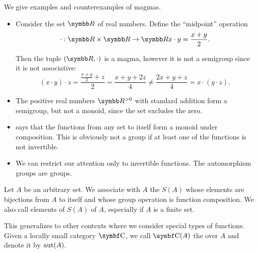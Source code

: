 \begin{example}\label{ex:magmas}
  We give examples and counterexamples of magmas.

  \begin{itemize}
    \item Consider the set \( \R \) of real numbers. Define the \enquote{midpoint} operation
    \begin{equation*}
      \cdot: \R \times \R \to \R \\
      x \cdot y = \frac {x + y} 2.
    \end{equation*}

    Then the tuple \( (\R, \cdot) \) is a magma, however it is not a semigroup since it is not associative:
    \begin{equation*}
      (x \cdot y) \cdot z = \frac {{\frac {x + y} 2} + z} 2 = \frac {x + y + 2z} 4
      \neq
      \frac {2x + y + z} 4 = x \cdot (y \cdot z).
    \end{equation*}

    \item The positive real numbers \( \R^{>0} \) with standard addition form a semigroup, but not a monoid, since the set excludes the zero.

    \item {} says that the functions from any set to itself form a monoid under composition. This is obviously not a group if at least one of the functions is not invertible.

    \item We can restrict our attention only to invertible functions. The automorphism groups are groups.
  \end{itemize}
\end{example}

\begin{definition}\label{def:symmetric_group}
  Let \( A \) be an arbitrary set. We associate with \( A \) the  \( S(A) \) whose elements are bijections from \( A \) to itself and whose group operation is function composition. We also call elements of \( S(A) \)  of \( A \), especially if \( A \) is a finite set.

  This generalizes to other contexts where we consider special types of functions. Given a locally small category \( \Bold{C} \), we call \( \Bold{C}(A) \) the  over \( A \) and denote it by \( \operatorname{aut}(A) \).
\end{definition}

